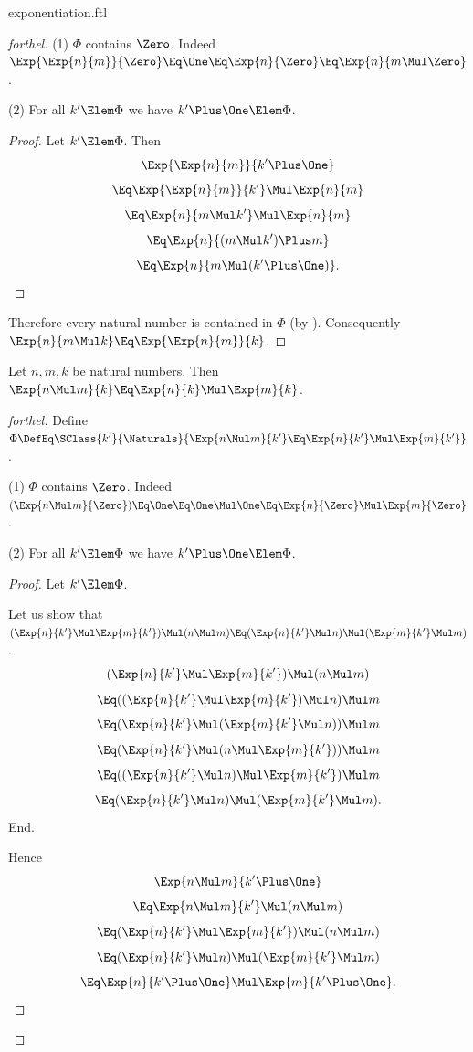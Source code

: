 \documentclass{stex}
\begin{document}
\begin{smodule}{exponentiation.ftl}
\begin{proof}[forthel]
  (1) $\Phi$ contains $\Zero$.
  Indeed $\Exp{\Exp{n}{m}}{\Zero}
    \Eq \One
    \Eq \Exp{n}{\Zero}
    \Eq \Exp{n}{m \Mul \Zero}$.

  (2) For all $k' \Elem \Phi$ we have $k' \Plus \One \Elem \Phi$.
  \begin{proof}
    Let $k' \Elem \Phi$.
    Then
    \[  \Exp{\Exp{n}{m}}{k' \Plus \One}                \]
    \[    \Eq \Exp{\Exp{n}{m}}{k'} \Mul \Exp{n}{m}    \]
    \[    \Eq \Exp{n}{m \Mul k'} \Mul \Exp{n}{m}  \]
    \[    \Eq \Exp{n}{(m \Mul k') \Plus m}        \]
    \[    \Eq \Exp{n}{m \Mul (k' \Plus \One)}.       \]
  \end{proof}

  Therefore every natural number is contained in $\Phi$ (by ).
  Consequently $\Exp{n}{m \Mul k} \Eq \Exp{\Exp{n}{m}}{k}$.
\end{proof}

\begin{proposition*}[forthel]
  Let $n, m, k$ be natural numbers.
  Then $\Exp{n \Mul m}{k} \Eq \Exp{n}{k} \Mul \Exp{m}{k}$.
\end{proposition*}
\begin{proof}[forthel]
  Define $\Phi \DefEq \SClass{k'}{\Naturals}{\Exp{n \Mul m}{k'} \Eq \Exp{n}{k'} \Mul \Exp{m}{k'}}$.

  (1) $\Phi$ contains $\Zero$.
  Indeed $(\Exp{n \Mul m}{\Zero})
    \Eq \One
    \Eq \One \Mul \One
    \Eq \Exp{n}{\Zero} \Mul \Exp{m}{\Zero}$. %

  (2) For all $k' \Elem \Phi$ we have $k' \Plus \One \Elem \Phi$.
  \begin{proof}
    Let $k' \Elem \Phi$.

    Let us show that $(\Exp{n}{k'} \Mul \Exp{m}{k'}) \Mul (n \Mul m) \Eq (\Exp{n}{k'} \Mul n) \Mul (\Exp{m}{k'} \Mul m)$.
      \[  (\Exp{n}{k'} \Mul \Exp{m}{k'}) \Mul (n \Mul m)       \]
      \[    \Eq ((\Exp{n}{k'} \Mul \Exp{m}{k'}) \Mul n) \Mul m   \]
      \[    \Eq (\Exp{n}{k'} \Mul (\Exp{m}{k'} \Mul n)) \Mul m   \]
      \[    \Eq (\Exp{n}{k'} \Mul (n \Mul \Exp{m}{k'})) \Mul m   \]
      \[    \Eq ((\Exp{n}{k'} \Mul n) \Mul \Exp{m}{k'}) \Mul m   \]
      \[    \Eq (\Exp{n}{k'} \Mul n) \Mul (\Exp{m}{k'} \Mul m).  \]
    End.

    Hence
    \[  \Exp{n \Mul m}{k' \Plus \One}                          \]
    \[    \Eq \Exp{n \Mul m}{k'} \Mul (n \Mul m)        \]
    \[    \Eq (\Exp{n}{k'} \Mul \Exp{m}{k'}) \Mul (n \Mul m)   \]
    \[    \Eq (\Exp{n}{k'} \Mul n) \Mul (\Exp{m}{k'} \Mul m)   \]
    \[    \Eq \Exp{n}{k' \Plus \One} \Mul \Exp{m}{k' \Plus \One}.              \]
  \end{proof}


\end{proof}
\end{smodule}
\end{document}
